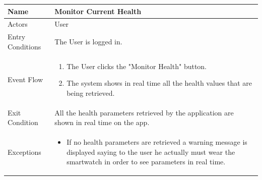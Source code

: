 \begin{enumerate}
\FloatBarrier
\begin{table}[h]
\begin{tabular}{|l|p{}|}
\hline
Name             & Monitor Current Health \\ \hline
Actors           & User  \\ \hline
Entry Conditions & The User is logged in. \\ \hline
Event Flow       & \begin{enumerate}
            \item The User clicks the "Monitor Health" button.
            \item The system shows in real time all the health values that are being retrieved.
        \end{enumerate}\\ \hline
Exit Condition   & All the health parameters retrieved by the application are shown in real time on the app.\\ \hline
Exceptions       & \begin{itemize}
\item If no health parameters are retrieved a warning message is displayed saying to the user he actually must wear the smartwatch in order to see parameters in real time. 
\end{itemize} \\ \hline
\end{tabular}
\end{table}
\FloatBarrier


\end{enumerate}
